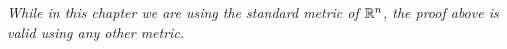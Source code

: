 \begin{comment}
	{\em Looking more closely at what we are doing, one can prove that it is equivalent to follow this linearisation procedure or to take the derivatives of $F$ with respect to the second order terms.}
\end{comment}

\begin{oss}
	{\em While in this chapter we are using the standard metric of $\mathbb{R}^n$, the proof above is valid using any other metric.}
\end{oss}
\begin{comment}
	contenuto...
	If one considers the F which are linear in the $\kappa_{i}$, this yields:  
	
	\begin{align*}
		\frac{\partial Y_t}{\partial t} &= \left(\frac{\partial F}{\partial\kappa_{i}} \kappa_{i} \right)\nu\\
		\frac{\partial Y_t}{\partial t} &= \frac{\partial F}{\partial\kappa_{i}} o^{ik} h_{kl}o^{li}\,\nu \\ 
		\frac{\partial Y_t}{\partial t} &= \frac{\partial F}{\partial\kappa_{i}}   o^{ik}o^{li}\left\langle \frac{\partial^2 Y_t}{\partial x_k\partial x_l} , \nu \right\rangle \,\nu + \text{lower order terms}
	\end{align*}
	implying summation convention, for an appropriate orthogonal matrix $o_{li}$ that makes $h_{ij}$ diagonal, which makes the equation parabolic if $\frac{\partial F}{\partial \kappa_i}$ is positive. 
	
	{\vspace{10pt}\LARGE \bf [NEED HELP WITH PARABOLICITY!]}
	
	In \cite{huisken}, the paper considers F as a function of the second fundamental form $h_{ij}$, as the principal curvatures are themselves function of it. The following is then said, speaking about "linearisation", while also citing the Weingarten equations:
	\begin{align*}
		\frac{\partial Y_t}{\partial t} &= \frac{\partial F}{\partial h_{i j}} g^{i k}g^{jl}h_{k l} \nu+ \mathrm{lower \ order \ terms}\\
		\frac{\partial Y_t}{\partial t} &= \frac{\partial F}{\partial h_{i j}} g^{i k}g^{jl}\left\langle \frac{\partial^2 Y_t}{\partial x_k\partial x_l} , \nu \right\rangle \nu+ \mathrm{lower \ order \ terms}
	\end{align*}
	Which I did not understand the implication of (especially with respect to maximum principle - there is probably something I am missing due to non-linearity of the equation). 
	
	\begin{theorem}[Parabolicity of the differential equation (\ref{evolutioneq})]
		da scrivere\label{graphparabolic}
	\end{theorem}
	
	Il conto probabilmente è quello in \cite{hamilton}, pagina 262. Info sul nostro caso sono in \cite{huisken}, pagina 50. 
	
	{\vspace{10pt}\LARGE \bf [NEED HELP!]}
	
\end{comment}

